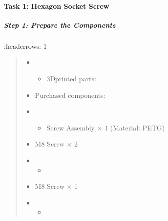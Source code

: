 \documentclass[letterpaper,10pt,english]{sphinxmanual}
\begin{document}
\paragraph{Task 1: Hexagon Socket Screw}
\label{\detokenize{4-Assembly-Instructions-Screws-and-Nuts:task-1-hexagon-socket-screw}}

\subparagraph{Step 1: Prepare the Components}
\label{\detokenize{4-Assembly-Instructions-Screws-and-Nuts:step-1-prepare-the-components}}
\sphinxAtStartPar
    :header\sphinxhyphen{}rows: 1
\begin{quote}
\begin{itemize}
\item {} \begin{itemize}
\item {} 
\sphinxAtStartPar
3D\sphinxhyphen{}printed parts:

\end{itemize}

\end{itemize}
\begin{itemize}
\item {} 
\sphinxAtStartPar
Purchased components:

\end{itemize}
\begin{itemize}
\item {} \begin{itemize}
\item {} 
\sphinxAtStartPar
Screw Assembly × 1 (Material: PETG)

\end{itemize}

\end{itemize}
\begin{itemize}
\item {} 
\sphinxAtStartPar
30mm M8 Screw × 2

\end{itemize}
\begin{itemize}
\item {} \begin{itemize}
\item {} 
\end{itemize}

\end{itemize}
\begin{itemize}
\item {} 
\sphinxAtStartPar
20mm M8 Screw × 1

\end{itemize}
\begin{itemize}
\item {} \begin{itemize}
\item {} 
\end{itemize}


\end{itemize}
\end{quote}
\end{document}
